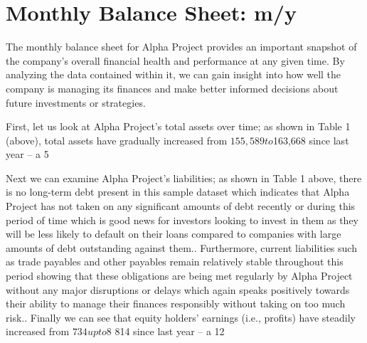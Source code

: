 

\section{Monthly Balance Sheet: m/y}\label{sec:title}

The monthly balance sheet for Alpha Project provides an important snapshot of the company's overall financial health and performance at any given time. By analyzing the data contained within it, we can gain insight into how well the company is managing its finances and make better informed decisions about future investments or strategies. 

First, let us look at Alpha Project's total assets over time; as shown in Table 1 (above), total assets have gradually increased from $155,589 to $163,668 since last year -- a 5%

Next we can examine Alpha Project's liabilities; as shown in Table 1 above, there is no long-term debt present in this sample dataset which indicates that Alpha Project has not taken on any significant amounts of debt recently or during this period of time which is good news for investors looking to invest in them as they will be less likely to default on their loans compared to companies with large amounts of debt outstanding against them.. Furthermore, current liabilities such as trade payables and other payables remain relatively stable throughout this period showing that these obligations are being met regularly by Alpha Project without any major disruptions or delays which again speaks positively towards their ability to manage their finances responsibly without taking on too much risk..  Finally we can see that equity holders' earnings (i.e., profits) have steadily increased from $734 up to $8 814 since last year -- a 12%

